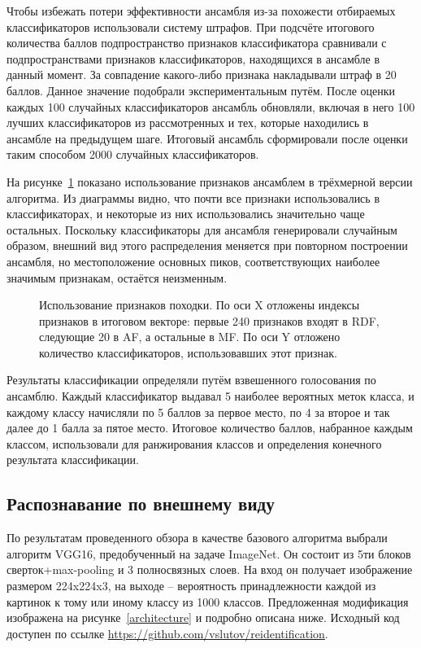 \documentclass[a4paper,twoside,11pt]{article}
\numberwithin{equation}{section}
\begin{document}
Чтобы избежать потери эффективности ансамбля из-за похожести отбираемых классификаторов использовали систему штрафов. При подсчёте итогового количества баллов подпространство признаков классификатора сравнивали с подпространствами признаков классификаторов, находящихся в ансамбле в данный момент. За совпадение какого-либо признака накладывали штраф в 20 баллов. Данное значение подобрали экспериментальным путём. После оценки каждых 100 случайных классификаторов ансамбль обновляли, включая в него 100 лучших классификаторов из рассмотренных и тех, которые находились в ансамбле на предыдущем шаге. Итоговый ансамбль сформировали после оценки таким способом 2000 случайных классификаторов.

На рисунке~\ref{featureusage} показано использование признаков ансамблем в трёхмерной версии алгоритма. Из диаграммы видно, что почти все признаки использовались в классификаторах, и некоторые из них использовались значительно чаще остальных. Поскольку классификаторы для ансамбля генерировали случайным образом, внешний вид этого распределения меняется при повторном построении ансамбля, но местоположение основных пиков, соответствующих наиболее значимым признакам, остаётся неизменным.

\begin{figure}[ht]
    \caption{Использование признаков походки. По оси X отложены индексы признаков в итоговом векторе: первые 240 признаков входят в RDF, следующие 20 в AF, а остальные в MF. По оси Y отложено количество классификаторов, использовавших этот признак.}
    \label{featureusage}
\end{figure}

Результаты классификации определяли путём взвешенного голосования по ансамблю. Каждый классификатор выдавал 5 наиболее вероятных меток класса, и каждому классу начисляли по 5 баллов за первое место, по 4 за второе и так далее до 1 балла за пятое место. Итоговое количество баллов, набранное каждым классом, использовали для ранжирования классов и определения конечного результата классификации.

\subsection{Распознавание по внешнему виду}

По результатам проведенного обзора в качестве базового алгоритма выбрали алгоритм VGG16, предобученный на задаче ImageNet. Он состоит из 5ти блоков сверток+max-pooling и 3 полносвязных слоев. На вход он получает изображение размером 224x224x3, на выходе -- вероятность принадлежности каждой из картинок к тому или иному классу из 1000 классов. Предложенная модификация изображена на рисунке~\ref{architecture} и подробно описана ниже. Исходный код доступен по ссылке \url{https://github.com/vslutov/reidentification}.
\end{document}
